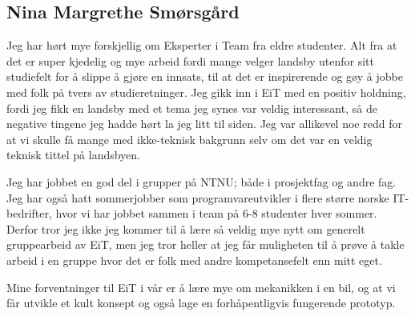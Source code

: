\subsection*{Nina Margrethe Smørsgård}
Jeg har hørt mye forskjellig om Eksperter i Team fra eldre studenter. Alt fra 
at det er super kjedelig og mye arbeid fordi mange velger landsby utenfor sitt 
studiefelt for å slippe å gjøre en innsats, til at det er inspirerende og gøy 
å jobbe med folk på tvers av studieretninger. Jeg gikk inn i EiT med en positiv 
holdning, fordi jeg fikk en landsby med et tema jeg synes var veldig 
interessant, så de negative tingene jeg hadde hørt la jeg litt til siden. Jeg 
var allikevel noe redd for at vi skulle få mange med ikke-teknisk bakgrunn selv 
om det var en veldig teknisk tittel på landsbyen.

Jeg har jobbet en god del i grupper på NTNU; både i prosjektfag og andre fag.
Jeg har også hatt sommerjobber som programvareutvikler i flere større norske IT-
bedrifter, hvor vi har jobbet sammen i team på 6-8 studenter hver sommer. 
Derfor tror jeg ikke jeg kommer til å lære så veldig mye nytt om generelt 
gruppearbeid av EiT, men jeg tror heller at jeg får muligheten til å prøve å 
takle arbeid i en gruppe hvor det er folk med andre kompetansefelt enn mitt eget.

Mine forventninger til EiT i vår er å lære mye om mekanikken i en bil, og at 
vi får utvikle et kult konsept og også lage en forhåpentligvis fungerende prototyp.
